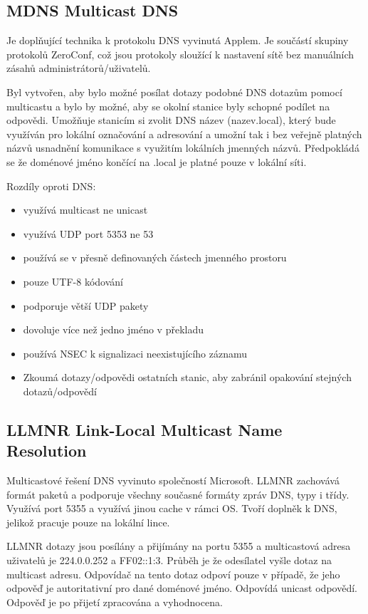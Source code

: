\subsection{MDNS Multicast DNS}

Je doplňující technika k protokolu DNS vyvinutá Applem.
Je součástí skupiny protokolů ZeroConf, což jsou protokoly sloužící k nastavení sítě bez manuálních zásahů administrátorů/uživatelů.

Byl vytvořen, aby bylo možné posílat dotazy podobné DNS dotazům pomocí multicastu a bylo by možné, aby se okolní stanice byly schopné podílet na odpovědi.
Umožňuje stanicím si zvolit DNS název (nazev.local), který bude využíván pro lokální označování a adresování a umožní tak i bez veřejně platných názvů usnadnění komunikace s využitím lokálních jmenných názvů.
Předpokládá se že doménové jméno končící na .local je platné pouze v lokální síti.

Rozdíly oproti DNS:
\begin{itemize}[noitemsep]
    \item využívá multicast ne unicast
    \item využívá UDP port 5353 ne 53
    \item používá se v přesně definovaných částech jmenného prostoru
    \item pouze UTF-8 kódování
    \item podporuje větší UDP pakety
    \item dovoluje více než jedno jméno v překladu
    \item používá NSEC k signalizaci neexistujícího záznamu
    \item Zkoumá dotazy/odpovědi ostatních stanic, aby zabránil opakování stejných dotazů/odpovědí
\end{itemize}

\subsection{LLMNR Link-Local Multicast Name Resolution}

Multicastové řešení DNS vyvinuto společností Microsoft.
LLMNR zachovává formát paketů a podporuje všechny současné formáty zpráv DNS, typy i třídy.
Využívá port 5355 a využívá jinou cache v rámci OS.
Tvoří doplněk k DNS, jelikož pracuje pouze na lokální lince.

LLMNR dotazy jsou posílány a přijímány na portu 5355 a multicastová adresa uživatelů je 224.0.0.252 a FF02::1:3.
Průběh je že odesílatel vyšle dotaz na multicast adresu.
Odpovídač na tento dotaz odpoví pouze v případě, že jeho odpověď je autoritativní pro dané doménové jméno.
Odpovídá unicast odpovědí.
Odpověď je po přijetí zpracována a vyhodnocena.


